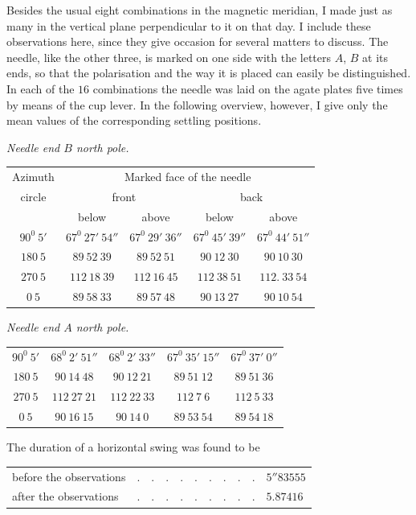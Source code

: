 Besides the usual eight combinations in the magnetic meridian, I made just as many in the vertical plane perpendicular to it on that day. I include these observations here, since they give occasion for several matters to discuss. The needle, like the other three, is marked on one side with the letters $A$, $B$ at its ends, so that the polarisation and the way it is placed can easily be distinguished. In each of the $16$ combinations the needle was laid on the agate plates five times by means of the cup lever. In the following overview, however, I give only the mean values of the corresponding settling positions.

\begin{center}
\textit{Needle end $B$ north pole.}\par\smallskip
{\fontsize{9}{11}\selectfont
\begin{tabular}{c||cc||cc}
Azimuth&\multicolumn{4}{c}{Marked face of the needle}\\
circle&\multicolumn{2}{c||}{front}&\multicolumn{2}{c}{back}\\
&below&above&below&above\\\hline
$90^0\ 5'$&$67^0\ 27'\ 54''$&$67^0\ 29'\ 36''$&$67^0\ 45'\ 39''$&$67^0\ 44'\ 51''$\\
$180\ 5$&$89\ 52\ 39$&$89\ 52\ 51$&$90\ 12\ 30$&$90\ 10\ 30$\\
$270\ 5$&$112\ 18\ 39$&$112\ 16\ 45$&$112\ 38\ 51$&$112.\ 33\ 54$\\
$0\ 5$&$89\ 58\ 33$&$89\ 57\ 48$&$90\ 13\ 27$&$90\ 10\ 54$
\end{tabular}}
\par\medskip
\textit{Needle end $A$ north pole.}\par\smallskip
{\fontsize{9}{11}\selectfont
\begin{tabular}{c||cc||cc}
$90^0\ 5'$&$68^0\ 2'\ 51''$&$68^0\ 2'\ 33''$&$67^0\ 35'\ 15''$&$67^0\ 37'\ 0''$\\
$180\ 5$&$90\ 14\ 48$&$90\ 12\ 21$&$89\ 51\ 12$&$89\ 51\ 36$\\
$270\ 5$&$112\ 27\ 21$&$112\ 22\ 33$&$112\ 7\ 6$&$112\ 5\ 33$\\
$0\ 5$&$90\ 16\ 15$&$90\ 14\ 0$&$89\ 53\ 54$&$89\ 54\ 18$
\end{tabular}}
\end{center}

The duration of a horizontal swing was found to be
\begin{center}
\begin{tabular}{lll}
before the observations&$.\quad.\quad.\quad.\quad.\quad.\quad.\quad.\quad.$&$5''83555$\\
after the observations&$.\quad.\quad.\quad.\quad.\quad.\quad.\quad.\quad.$&$5.87416$
\end{tabular}
\end{center}

